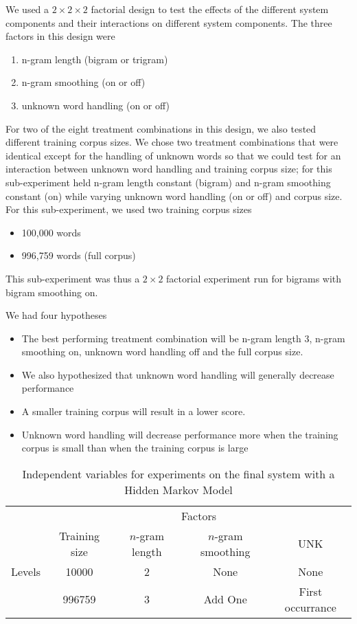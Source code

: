\documentclass{article}
\begin{document}
We used a $2\times2\times2$ factorial design to test the effects of the different
system components and their interactions on different system components.
The three factors in this design were
\begin{enumerate}
\item n-gram length (bigram or trigram)
\item n-gram smoothing (on or off)
\item unknown word handling (on or off)
\end{enumerate}
For two of the eight treatment combinations in this design, we also tested
different training corpus sizes. We chose two treatment combinations that were
identical except for the handling of unknown words so that we could test
for an interaction between unknown word handling and training corpus size;
for this sub-experiment held n-gram length constant (bigram) and n-gram
smoothing constant (on) while varying unknown word handling (on or off)
and corpus size. For this sub-experiment, we used two training corpus sizes
\begin{itemize}
\item 100,000 words
\item 996,759 words (full corpus)
\end{itemize}
This sub-experiment was thus a $2\times2$ factorial experiment run for
bigrams with bigram smoothing on.

We had four hypotheses
\begin{itemize}
\item The best performing treatment combination will be n-gram length 3,
n-gram smoothing on, unknown word handling off and the full corpus size.
\item We also hypothesized that unknown word handling will generally
decrease performance
\item A smaller training corpus will result in a lower score.
\item Unknown word handling will decrease performance more when the
training corpus is small than when the training corpus is large
\end{itemize}

\begin{table}
\begin{tabular}{lcccc}
& \multicolumn{4}{c}{Factors} \\
\cmidrule{2-5}
       & Training size & $n$-gram length & $n$-gram smoothing & UNK\\
\cmidrule{2-5}
Levels &  10000   &  2  & None    & None \\
       & 996759   &  3  & Add One & First occurrance  \\
\cmidrule{2-5}
\end{tabular}
\caption{\label{tab:ind_vars}Independent variables for experiments on the final system with a Hidden Markov Model}
\end{table}
\end{document}
